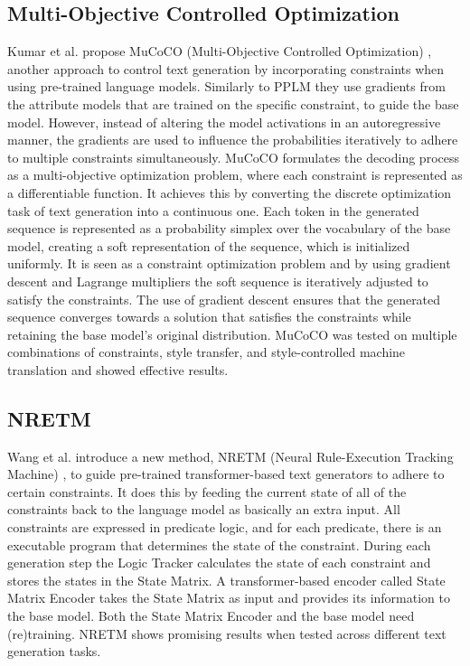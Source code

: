 \subsection{Multi-Objective Controlled Optimization}
Kumar et al. propose MuCoCO (Multi-Objective Controlled Optimization) \cite{kumar_controlled_2021}, another approach to control text generation by incorporating constraints when using pre-trained language models. Similarly to PPLM they use gradients from the attribute models that are trained on the specific constraint, to guide the base model. However, instead of altering the model activations in an autoregressive manner, the gradients are used to influence the probabilities iteratively to adhere to multiple constraints simultaneously. MuCoCO formulates the decoding process as a multi-objective optimization problem, where each constraint is represented as a differentiable function. It achieves this by converting the discrete optimization task of text generation into a continuous one. Each token in the generated sequence is represented as a probability simplex over the vocabulary of the base model, creating a soft representation of the sequence, which is initialized uniformly. It is seen as a constraint optimization problem and by using gradient descent and Lagrange multipliers the soft sequence is iteratively adjusted to satisfy the constraints. The use of gradient descent ensures that the generated sequence converges towards a solution that satisfies the constraints while retaining the base model's original distribution. MuCoCO was tested on multiple combinations of constraints, style transfer, and style-controlled machine translation and showed effective results. 


\subsection{NRETM}
Wang et al. introduce a new method, NRETM (Neural Rule-Execution Tracking Machine) \cite{wang_neural_2021}, to guide pre-trained transformer-based text generators to adhere to certain constraints. It does this by feeding the current state of all of the constraints back to the language model as basically an extra input. All constraints are expressed in predicate logic, and for each predicate, there is an executable program that determines the state of the constraint. During each generation step the Logic Tracker calculates the state of each constraint and stores the states in the State Matrix. A transformer-based encoder called State Matrix Encoder takes the State Matrix as input and provides its information to the base model. Both the State Matrix Encoder and the base model need (re)training. NRETM shows promising results when tested across different text generation tasks.


